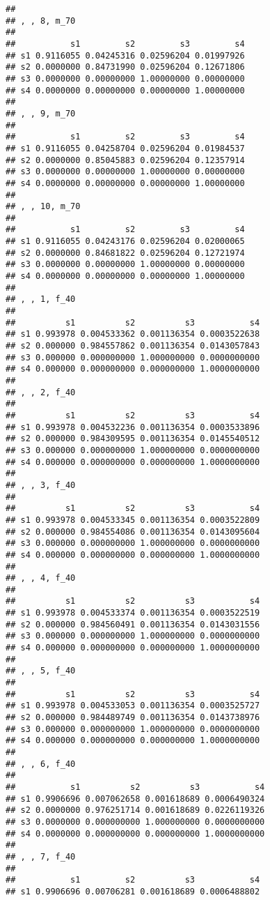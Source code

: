 \documentclass[
]{article}
\begin{document}
\begin{verbatim}
## 
## , , 8, m_70
## 
##           s1         s2         s3         s4
## s1 0.9116055 0.04245316 0.02596204 0.01997926
## s2 0.0000000 0.84731990 0.02596204 0.12671806
## s3 0.0000000 0.00000000 1.00000000 0.00000000
## s4 0.0000000 0.00000000 0.00000000 1.00000000
## 
## , , 9, m_70
## 
##           s1         s2         s3         s4
## s1 0.9116055 0.04258704 0.02596204 0.01984537
## s2 0.0000000 0.85045883 0.02596204 0.12357914
## s3 0.0000000 0.00000000 1.00000000 0.00000000
## s4 0.0000000 0.00000000 0.00000000 1.00000000
## 
## , , 10, m_70
## 
##           s1         s2         s3         s4
## s1 0.9116055 0.04243176 0.02596204 0.02000065
## s2 0.0000000 0.84681822 0.02596204 0.12721974
## s3 0.0000000 0.00000000 1.00000000 0.00000000
## s4 0.0000000 0.00000000 0.00000000 1.00000000
## 
## , , 1, f_40
## 
##          s1          s2          s3           s4
## s1 0.993978 0.004533362 0.001136354 0.0003522638
## s2 0.000000 0.984557862 0.001136354 0.0143057843
## s3 0.000000 0.000000000 1.000000000 0.0000000000
## s4 0.000000 0.000000000 0.000000000 1.0000000000
## 
## , , 2, f_40
## 
##          s1          s2          s3           s4
## s1 0.993978 0.004532236 0.001136354 0.0003533896
## s2 0.000000 0.984309595 0.001136354 0.0145540512
## s3 0.000000 0.000000000 1.000000000 0.0000000000
## s4 0.000000 0.000000000 0.000000000 1.0000000000
## 
## , , 3, f_40
## 
##          s1          s2          s3           s4
## s1 0.993978 0.004533345 0.001136354 0.0003522809
## s2 0.000000 0.984554086 0.001136354 0.0143095604
## s3 0.000000 0.000000000 1.000000000 0.0000000000
## s4 0.000000 0.000000000 0.000000000 1.0000000000
## 
## , , 4, f_40
## 
##          s1          s2          s3           s4
## s1 0.993978 0.004533374 0.001136354 0.0003522519
## s2 0.000000 0.984560491 0.001136354 0.0143031556
## s3 0.000000 0.000000000 1.000000000 0.0000000000
## s4 0.000000 0.000000000 0.000000000 1.0000000000
## 
## , , 5, f_40
## 
##          s1          s2          s3           s4
## s1 0.993978 0.004533053 0.001136354 0.0003525727
## s2 0.000000 0.984489749 0.001136354 0.0143738976
## s3 0.000000 0.000000000 1.000000000 0.0000000000
## s4 0.000000 0.000000000 0.000000000 1.0000000000
## 
## , , 6, f_40
## 
##           s1          s2          s3           s4
## s1 0.9906696 0.007062658 0.001618689 0.0006490324
## s2 0.0000000 0.976251714 0.001618689 0.0226119326
## s3 0.0000000 0.000000000 1.000000000 0.0000000000
## s4 0.0000000 0.000000000 0.000000000 1.0000000000
## 
## , , 7, f_40
## 
##           s1         s2          s3           s4
## s1 0.9906696 0.00706281 0.001618689 0.0006488802

\end{verbatim}
\end{document}
